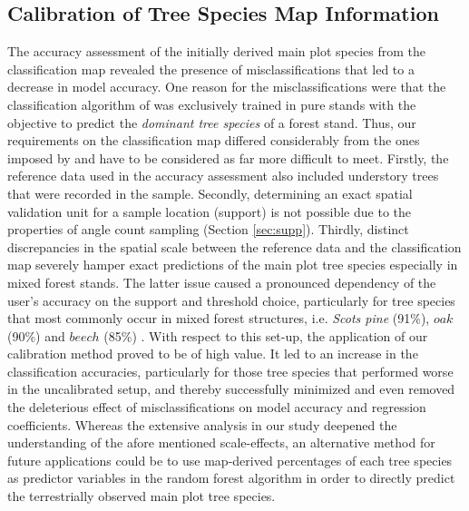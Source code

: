\subsection{Calibration of Tree Species Map Information}
\label{sec:calib_dis}
The accuracy assessment of the initially derived main plot species from the classification map revealed the presence of misclassifications that led to a decrease in model accuracy.  One reason for the misclassifications were that the classification algorithm of \citet{stoffels2015} was exclusively trained in pure stands with the objective to predict the \textit{dominant tree species} of a forest stand. Thus, our requirements on the classification map differed considerably from the ones imposed by \citet{stoffels2015} and have to be considered as far more difficult to meet. Firstly, the reference data used in the accuracy assessment also included understory trees that were recorded in the \bwi{} sample. Secondly, determining an exact spatial validation unit for a sample location (support) is not possible due to the properties of angle count sampling (Section \ref{sec:supp}). Thirdly, distinct discrepancies in the spatial scale between the reference data and the classification map severely hamper exact predictions of the main plot tree species especially in mixed forest stands. The latter issue caused a pronounced dependency of the user's accuracy on the support and threshold choice, particularly for tree species that most commonly occur in mixed forest structures, i.e. \textit{Scots pine} (91\%), $oak$ (90\%) and $beech$ (85\%) \citep{bwi3}. With respect to this set-up, the application of our calibration method proved to be of high value. It led to an increase in the classification accuracies, particularly for those tree species that performed worse in the uncalibrated setup, and thereby successfully minimized and even removed the deleterious effect of misclassifications on model accuracy and regression coefficients. Whereas the extensive analysis in our study deepened the understanding of the afore mentioned scale-effects, an alternative method for future applications could be to use map-derived percentages of each tree species as predictor variables in the random forest algorithm in order to directly predict the terrestrially observed main plot tree species.


